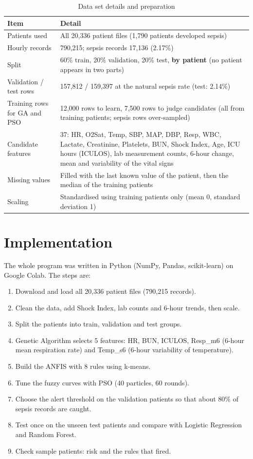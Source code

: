 \documentclass[11pt,a4paper]{article}
\begin{document}
\begin{table}[H]
\centering\small
\caption{Data set details and preparation}
\begin{tabular}{@{}p{4.2cm}p{11cm}@{}}
\toprule
\textbf{Item} & \textbf{Detail}\\\midrule
Patients used & All 20,336 patient files (1,790 patients developed sepsis)\\
Hourly records & 790,215; sepsis records 17,136 (2.17\%)\\
Split & 60\% train, 20\% validation, 20\% test, \textbf{by patient} (no patient appears in two parts)\\
Validation / test rows & 157,812 / 159,397 at the natural sepsis rate (test: 2.14\%)\\
Training rows for GA and PSO & 12,000 rows to learn, 7,500 rows to judge candidates (all from training patients; sepsis rows over-sampled)\\
Candidate features & 37: HR, O2Sat, Temp, SBP, MAP, DBP, Resp, WBC, Lactate, Creatinine, Platelets, BUN, Shock Index, Age, ICU hours (ICULOS), lab measurement counts, 6-hour change, mean and variability of the vital signs\\
Missing values & Filled with the last known value of the patient, then the median of the training patients\\
Scaling & Standardised using training patients only (mean 0, standard deviation 1)\\\bottomrule
\end{tabular}
\end{table}

\section{Implementation}
The whole program was written in Python (NumPy, Pandas, scikit-learn) on Google Colab. The steps are:
\begin{enumerate}[nosep]
\item Download and load all 20,336 patient files (790,215 records).
\item Clean the data, add Shock Index, lab counts and 6-hour trends, then scale.
\item Split the patients into train, validation and test groups.
\item Genetic Algorithm selects 5 features: HR, BUN, ICULOS, Resp\_m6 (6-hour mean respiration rate) and Temp\_s6 (6-hour variability of temperature).
\item Build the ANFIS with 8 rules using k-means.
\item Tune the fuzzy curves with PSO (40 particles, 60 rounds).
\item Choose the alert threshold on the validation patients so that about 80\% of sepsis records are caught.
\item Test once on the unseen test patients and compare with Logistic Regression and Random Forest.
\item Check sample patients: risk and the rules that fired.
\end{enumerate}
\end{document}
